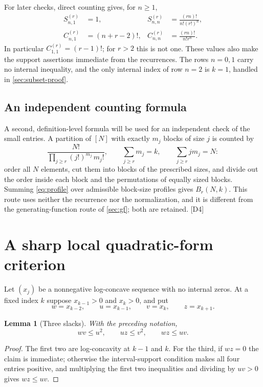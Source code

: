 \documentclass[11pt,a4paper]{article}
\numberwithin{equation}{section}
\newtheorem{lemma}[lemma]{Lemma}
\theoremstyle{definition}
\theoremstyle{remark}
\newcommand{\Snum}[3]{S^{(#1)}_{#2,#3}}
\newcommand{\Cnum}[3]{C^{(#1)}_{#2,#3}}
\newcommand{\dup}[1]{{\small\textsf{\color{MutedInk}[#1]}}}
\begin{document}
For later checks, direct counting gives, for $n\ge1$,
\begin{align}
 \Snum r n1&=1,&
 \Snum r nn&=\frac{(rn)!}{n!(r!)^n},\label{eq:Sboundary}\\
 \Cnum r n1&=(n+r-2)!,&
 \Cnum r nn&=\frac{(rn)!}{n!r^n}.\label{eq:Cboundary}
\end{align}
In particular $C^{(r)}_{1,1}=(r-1)!$; for $r>2$ this is not one.
These values also make the support assertions immediate from the recurrences.
The rows $n=0,1$ carry no internal inequality, and the only internal index
of row $n=2$ is $k=1$, handled in \cref{sec:subset-proof}.

\subsection{An independent counting formula}\label{subsec:profile}

A second, definition-level formula will be used for an independent check of
the small entries. A partition of $[N]$ with exactly $m_j$ blocks of size
$j$ is counted by
\begin{equation}\label{eq:profile}
 \frac{N!}{\prod_{j\ge r}(j!)^{m_j}\,m_j!},\qquad
 \sum_{j\ge r}m_j=k,\qquad\sum_{j\ge r}jm_j=N:
\end{equation}
order all $N$ elements, cut them into blocks of the prescribed sizes, and
divide out the order inside each block and the permutations of equally
sized blocks. Summing \eqref{eq:profile} over admissible block-size
profiles gives $B_r(N,k)$. This route uses neither the recurrence nor the
normalization, and it is different from the generating-function route of
\cref{sec:gf}; both are retained. \dup{D4}

\section{A sharp local quadratic-form criterion}\label{sec:criterion}

Let $(x_j)$ be a nonnegative log-concave sequence with no internal zeros.
At a fixed index $k$ suppose $x_{k-1}>0$ and $x_k>0$, and put
\[
 w=x_{k-2},\qquad u=x_{k-1},\qquad v=x_k,\qquad z=x_{k+1}.
\]

\begin{lemma}[Three slacks]\label{lem:cross}
With the preceding notation,
\begin{equation}\label{eq:three-slacks}
 wv\le u^2,\qquad uz\le v^2,\qquad wz\le uv.
\end{equation}
\end{lemma}
\begin{proof}
The first two are log-concavity at $k-1$ and $k$. For the third, if
$wz=0$ the claim is immediate; otherwise the interval-support condition
makes all four entries positive, and multiplying the first two
inequalities and dividing by $uv>0$ gives $wz\le uv$.
\end{proof}
\end{document}

